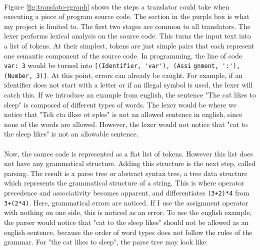 \documentclass[a4paper, 12pt]{article}
\begin{document}
\\
Figure \ref{fig:translato-rgraph} shows the steps a translator could take when executing a piece of program source code. The section in the purple box is what my project is limited to. The first two stages are common to all translators. The lexer performs lexical analysis on the source code. This turns the input text into a list of tokens. At their simplest, tokens are just simple pairs that each represent one semantic component of the source code. In programming, the line of code \verb|var: 3| would be turned into \verb|[(Identifier, 'var'), (Assi| \verb|gnment, ':'), (Number, 3)]|. At this point, errors can already be caught. For example, if an identifier does not start with a letter or if an illegal symbol is used, the lexer will catch this. If we introduce an example from english, the sentence "The cat likes to sleep" is composed of different types of words. The lexer would be where we notice that "Teh cta ilkse ot eples" is not an allowed sentence in english, since none of the words are allowed. However, the lexer would not notice that "cat to the sleep likes" is not an allowable sentence.\\
\\
Now, the source code is represented as a flat list of tokens. However this list does not have any grammatical structure. Adding this structure is the next step, called parsing. The result is a parse tree or abstract syntax tree, a tree data structure which represents the grammatical structure of a string. This is where operator precedence and associativity becomes apparent, and differentiates \verb|(3+2)*4| from \verb|3+(2*4)|. Here, grammatical errors are noticed. If I use the assignment operator with nothing on one side, this is noticed as an error. To use the english example, the parser would notice that "cat to the sleep likes" should not be allowed as an english sentence, because the order of word types does not follow the rules of the grammar. For "the cat likes to sleep", the parse tree may look like:\\
\end{document}
